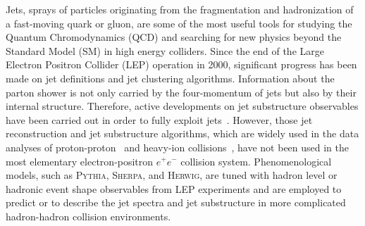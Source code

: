 \documentclass[aps,preprint,superscriptaddress,groupedaddress]{revtex4}  %
\newcommand{\sherpa}{\textsc{Sherpa}\xspace}
\newcommand{\herwig}{\textsc{Herwig}\xspace}
\newcommand{\pythia}[1]{\textsc{Pythia}{#1}\xspace}
\begin{document}
Jets, sprays of particles originating from the fragmentation and hadronization of a fast-moving quark or gluon, are some of the most useful tools for studying the Quantum Chromodynamics (QCD) and searching for new physics beyond the Standard Model (SM) in high energy colliders. Since the end of the Large Electron Positron Collider (LEP) operation in 2000, significant progress has been made on jet definitions and jet clustering algorithms. Information about the parton shower is not only carried by the four-momentum of jets but also by their internal structure. Therefore, active developments on jet substructure observables have been carried out in order to fully exploit jets~\cite{Abdesselam:2010pt,Salam:2010nqg,Altheimer:2012mn,Larkoski:2017jix}. However, those jet reconstruction and jet substructure algorithms, which are widely used in the data analyses of proton-proton~\cite{Kogler:2018hem} and heavy-ion
collisions~\cite{Connors:2017ptx,Cao:2020wlm,Cunqueiro:2021wls}, have not been used in the most elementary electron-positron $e^+e^-$ collision system. 
Phenomenological models, such as \pythia{}\cite{Sjostrand:2000wi}, \sherpa\cite{Gleisberg:2008ta}, and \herwig\cite{Reichelt:2017hts}, are tuned with hadron level or hadronic event shape observables from LEP experiments and are employed to predict or to describe the jet spectra and jet substructure in more complicated hadron-hadron collision environments. 

\end{document}

